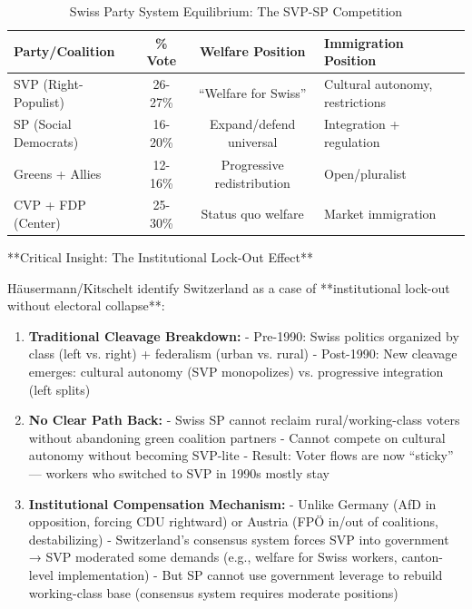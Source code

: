 \begin{table}[h]
\centering
\caption{Swiss Party System Equilibrium: The SVP-SP Competition}
\label{tab:swiss-party-equilibrium}
\begin{tabular}{lccl}
\toprule
\textbf{Party/Coalition} & \textbf{\% Vote} & \textbf{Welfare Position} & \textbf{Immigration Position} \\
\midrule
SVP (Right-Populist) & 26-27\% & ``Welfare for Swiss'' & Cultural autonomy, restrictions \\
SP (Social Democrats) & 16-20\% & Expand/defend universal & Integration + regulation \\
Greens + Allies & 12-16\% & Progressive redistribution & Open/pluralist \\
CVP + FDP (Center) & 25-30\% & Status quo welfare & Market immigration \\
\bottomrule
\end{tabular}
\end{table}

**Critical Insight: The Institutional Lock-Out Effect**

Häusermann/Kitschelt identify Switzerland as a case of **institutional lock-out without electoral collapse**:

\begin{enumerate}

\item \textbf{Traditional Cleavage Breakdown:}
   - Pre-1990: Swiss politics organized by class (left vs. right) + federalism (urban vs. rural)
   - Post-1990: New cleavage emerges: cultural autonomy (SVP monopolizes) vs. progressive integration (left splits)

\item \textbf{No Clear Path Back:}
   - Swiss SP cannot reclaim rural/working-class voters without abandoning green coalition partners
   - Cannot compete on cultural autonomy without becoming SVP-lite
   - Result: Voter flows are now ``sticky'' — workers who switched to SVP in 1990s mostly stay

\item \textbf{Institutional Compensation Mechanism:}
   - Unlike Germany (AfD in opposition, forcing CDU rightward) or Austria (FPÖ in/out of coalitions, destabilizing)
   - Switzerland's consensus system forces SVP into government → SVP moderated some demands (e.g., welfare for Swiss workers, canton-level implementation)
   - But SP cannot use government leverage to rebuild working-class base (consensus system requires moderate positions)

\end{enumerate}

